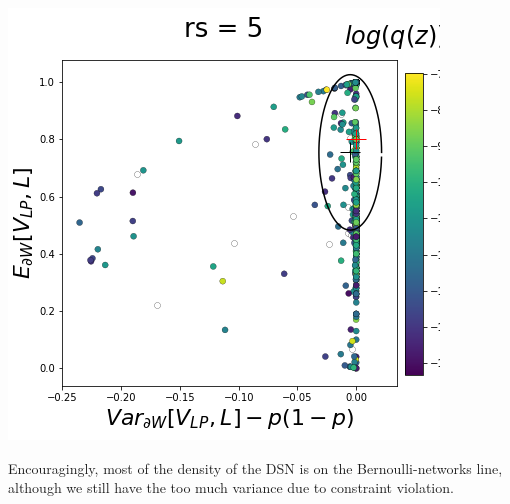 \documentclass[11pt]{article}
\begin{document}
\begin{center}
\includegraphics[scale=0.33]{figs/T_x_SC_pvar_full_c=0_p=80_rs=5.png}
\end{center}

Encouragingly, most of the density of the DSN is on the Bernoulli-networks line, although we still have the too much variance due to constraint violation.



\end{document}
